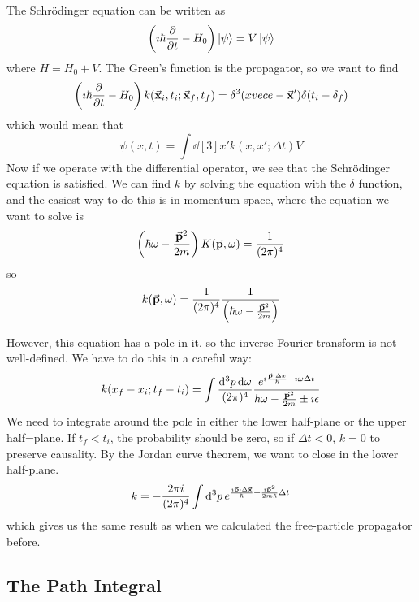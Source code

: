 \documentclass[a4paper,twoside,master.tex]{subfiles}
\begin{document}
The Schr\"odinger equation can be written as
\begin{equation}
    \left( \imath \hbar \pdv{t} - H_0 \right)\ket{\psi} = V\ket{\psi}
\end{equation}
where $ H = H_0 + V $. The Green's function is the propagator, so we want to find
\begin{equation}
    \left( \imath \hbar \pdv{t} - H_0 \right) k(\va{x}_i, t_i ; \va{x}_f, t_f) = \delta^3(x vece - \va{x} ') \delta(t_i - \delta_f)
\end{equation}
which would mean that
\begin{equation}
    \psi(x,t) = \int \dd[3]{x'} k(x,x'; \Delta t) V
\end{equation}
Now if we operate with the differential operator, we see that the Schr\"odinger equation is satisfied. We can find $ k $ by solving the equation with the $\delta$ function, and the easiest way to do this is in momentum space, where the equation we want to solve is
\begin{equation}
    \left( \hbar \omega - \frac{\va{p}^2}{2m} \right) K(\va{p}, \omega) = \frac{1}{(2 \pi)^4}
\end{equation}
so
\begin{equation}
    k(\va{p}, \omega) = \frac{1}{(2 \pi)^4} \frac{1}{\left( \hbar \omega - \frac{\va{p}^2}{2m} \right)}
\end{equation}

However, this equation has a pole in it, so the inverse Fourier transform is not well-defined. We have to do this in a careful way:
\begin{equation}
    k(x_f - x_i; t_f - t_i) = \int \frac{\dd[3]{p} \dd{\omega}}{(2 \pi)^4} \frac{e^{\imath \frac{\va{p} \vdot \Delta x}{\hbar} - \imath \omega \Delta t}}{\hbar \omega - \frac{\va{p}^2}{2m} \pm \imath \epsilon}
\end{equation}
We need to integrate around the pole in either the lower half-plane or the upper half=plane. If $ t_f < t_i $, the probability should be zero, so if $ \Delta t < 0 $, $ k = 0 $ to preserve causality. By the Jordan curve theorem, we want to close in the lower half-plane.
\begin{equation}
    k = - \frac{2 \pi i}{(2 \pi)^4} \int \dd[3]{p} e^{\frac{\imath \va{p} \vdot \Delta \va{x}}{\hbar} + \frac{\imath \va{p}^2}{2m \hbar} \Delta t}
\end{equation}
which gives us the same result as when we calculated the free-particle propagator before.

\subsection{The Path Integral}
\label{sub:the_path_integral}
\end{document}
